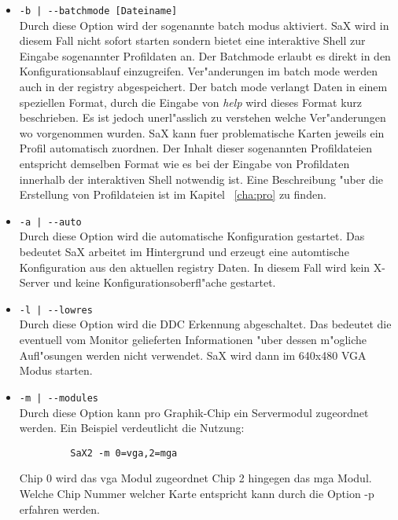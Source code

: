 \begin{itemize}
\item \verb+-b | --batchmode [Dateiname]+\\
      Durch diese Option wird der sogenannte batch modus aktiviert.
      SaX wird in diesem Fall nicht sofort starten sondern bietet 
      eine interaktive Shell zur Eingabe sogenannter Profildaten
      an. Der Batchmode erlaubt es direkt in den Konfigurationsablauf 
      einzugreifen. Ver"anderungen im batch mode werden auch in der 
      registry abgespeichert.
      Der batch mode verlangt Daten in einem speziellen Format, durch 
      die Eingabe von \textit{help} wird dieses Format kurz 
      beschrieben. Es ist jedoch unerl"asslich zu verstehen welche
      Ver"anderungen wo vorgenommen wurden. 
      SaX kann fuer problematische Karten jeweils ein 
      Profil automatisch zuordnen. Der Inhalt dieser sogenannten
      Profildateien entspricht demselben Format wie es bei der
      Eingabe von Profildaten innerhalb der interaktiven Shell 
      notwendig ist. Eine Beschreibung "uber die Erstellung von
      Profildateien ist im Kapitel ~\ref{cha:pro} zu finden.
      
\item \verb+-a | --auto+\\
      Durch diese Option wird die automatische Konfiguration 
      gestartet. Das bedeutet SaX arbeitet im Hintergrund und
      erzeugt eine automtische Konfiguration aus den aktuellen 
      registry Daten. In diesem Fall wird kein X-Server und 
      keine Konfigurationsoberfl"ache gestartet. 

\item \verb+-l | --lowres+\\
      Durch diese Option wird die DDC Erkennung abgeschaltet.
      Das bedeutet die eventuell vom Monitor gelieferten Informationen 
      "uber dessen m"ogliche Aufl"osungen werden nicht verwendet.
      SaX wird dann im 640x480 VGA Modus starten.

\item \verb+-m | --modules+\\
      Durch diese Option kann pro Graphik-Chip ein Servermodul 
      zugeordnet werden. Ein Beispiel verdeutlicht die Nutzung:
      \begin{verbatim}
         SaX2 -m 0=vga,2=mga 
      \end{verbatim}
      Chip 0 wird das vga Modul zugeordnet Chip 2 hingegen das
      mga Modul. Welche Chip Nummer welcher Karte entspricht 
      kann durch die Option -p erfahren werden.
      

\end{itemize}
